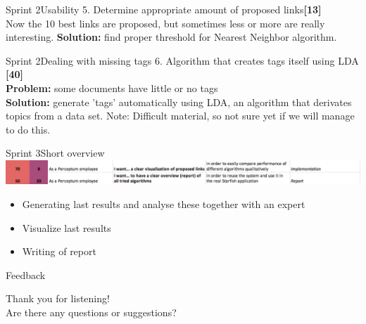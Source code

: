 \begin{frame}{Sprint 2}{Usability}
{\large 5. Determine appropriate amount of proposed links{\bf [13]}}\\
Now the 10 best links are proposed, but sometimes less or more are really interesting.\newline \newline
{\bf Solution:} find proper threshold for Nearest Neighbor algorithm. 
\end{frame}

\begin{frame}{Sprint 2}{Dealing with missing tags}
{\large 6. Algorithm that creates tags itself using LDA {\bf[40]}}\\
{\bf Problem:} some documents have little or no tags\\
{\bf Solution:} generate 'tags' automatically using LDA, an algorithm that derivates topics from a data set.\newline \newline
Note: Difficult material, so not sure yet if we will manage to do this. 
\end{frame}

\begin{frame}{Sprint 3}{Short overview}
\includegraphics[width=\linewidth]{sprint2.jpg}
\begin{itemize}
\item Generating last results and analyse these together with an expert
\item Visualize last results
\item Writing of report
\end{itemize}

\end{frame}

\begin{frame}{Feedback}

{\large Thank you for listening!}\\
Are there any questions or suggestions?
\end{frame}